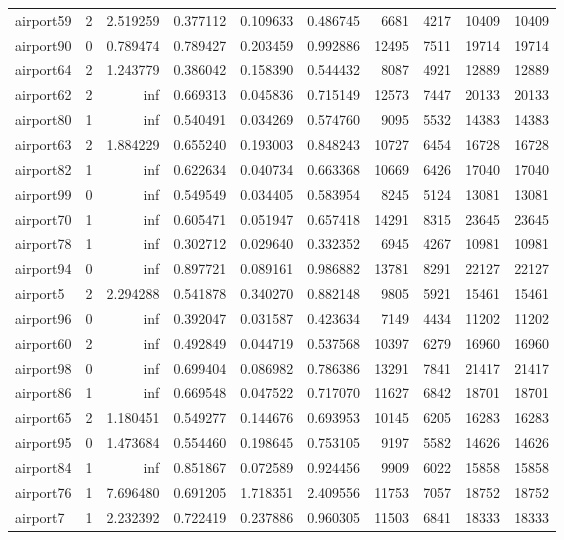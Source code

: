 \begin{longtable}{|l|r|r|r|r|r|r|r|r|r|}
airport59 & 2 & 2.519259 & 0.377112 & 0.109633 & 0.486745 & 6681 & 4217 & 10409 & 10409 \\
airport90 & 0 & 0.789474 & 0.789427 & 0.203459 & 0.992886 & 12495 & 7511 & 19714 & 19714 \\
airport64 & 2 & 1.243779 & 0.386042 & 0.158390 & 0.544432 & 8087 & 4921 & 12889 & 12889 \\
airport62 & 2 & inf & 0.669313 & 0.045836 & 0.715149 & 12573 & 7447 & 20133 & 20133 \\
airport80 & 1 & inf & 0.540491 & 0.034269 & 0.574760 & 9095 & 5532 & 14383 & 14383 \\
airport63 & 2 & 1.884229 & 0.655240 & 0.193003 & 0.848243 & 10727 & 6454 & 16728 & 16728 \\
airport82 & 1 & inf & 0.622634 & 0.040734 & 0.663368 & 10669 & 6426 & 17040 & 17040 \\
airport99 & 0 & inf & 0.549549 & 0.034405 & 0.583954 & 8245 & 5124 & 13081 & 13081 \\
airport70 & 1 & inf & 0.605471 & 0.051947 & 0.657418 & 14291 & 8315 & 23645 & 23645 \\
airport78 & 1 & inf & 0.302712 & 0.029640 & 0.332352 & 6945 & 4267 & 10981 & 10981 \\
airport94 & 0 & inf & 0.897721 & 0.089161 & 0.986882 & 13781 & 8291 & 22127 & 22127 \\
airport5 & 2 & 2.294288 & 0.541878 & 0.340270 & 0.882148 & 9805 & 5921 & 15461 & 15461 \\
airport96 & 0 & inf & 0.392047 & 0.031587 & 0.423634 & 7149 & 4434 & 11202 & 11202 \\
airport60 & 2 & inf & 0.492849 & 0.044719 & 0.537568 & 10397 & 6279 & 16960 & 16960 \\
airport98 & 0 & inf & 0.699404 & 0.086982 & 0.786386 & 13291 & 7841 & 21417 & 21417 \\
airport86 & 1 & inf & 0.669548 & 0.047522 & 0.717070 & 11627 & 6842 & 18701 & 18701 \\
airport65 & 2 & 1.180451 & 0.549277 & 0.144676 & 0.693953 & 10145 & 6205 & 16283 & 16283 \\
airport95 & 0 & 1.473684 & 0.554460 & 0.198645 & 0.753105 & 9197 & 5582 & 14626 & 14626 \\
airport84 & 1 & inf & 0.851867 & 0.072589 & 0.924456 & 9909 & 6022 & 15858 & 15858 \\
airport76 & 1 & 7.696480 & 0.691205 & 1.718351 & 2.409556 & 11753 & 7057 & 18752 & 18752 \\
airport7 & 1 & 2.232392 & 0.722419 & 0.237886 & 0.960305 & 11503 & 6841 & 18333 & 18333 \\

\end{longtable}

